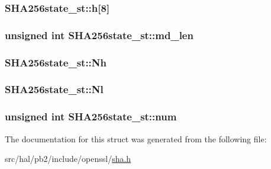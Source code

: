 \subsubsection[{\texorpdfstring{h}{h}}]{ S\+H\+A256state\+\_\+st\+::h\mbox{[}8\mbox{]}}\hypertarget{struct_s_h_a256state__st_a8a5e81981080254a7aa9ad6e11a4f253}{}\label{struct_s_h_a256state__st_a8a5e81981080254a7aa9ad6e11a4f253}
\subsubsection[{\texorpdfstring{md\+\_\+len}{md_len}}]{\setlength{\rightskip}{0pt plus 5cm}unsigned int S\+H\+A256state\+\_\+st\+::md\+\_\+len}\hypertarget{struct_s_h_a256state__st_a8156b1d2d8afc2bd0f0875a943b9f36a}{}\label{struct_s_h_a256state__st_a8156b1d2d8afc2bd0f0875a943b9f36a}
\subsubsection[{\texorpdfstring{Nh}{Nh}}]{ S\+H\+A256state\+\_\+st\+::\+Nh}\hypertarget{struct_s_h_a256state__st_a02ad38687202dc1f21f78925599ec5ca}{}\label{struct_s_h_a256state__st_a02ad38687202dc1f21f78925599ec5ca}
\subsubsection[{\texorpdfstring{Nl}{Nl}}]{ S\+H\+A256state\+\_\+st\+::\+Nl}\hypertarget{struct_s_h_a256state__st_ac34962074aa1766470fae99d0e2aef9b}{}\label{struct_s_h_a256state__st_ac34962074aa1766470fae99d0e2aef9b}
\subsubsection[{\texorpdfstring{num}{num}}]{\setlength{\rightskip}{0pt plus 5cm}unsigned int S\+H\+A256state\+\_\+st\+::num}\hypertarget{struct_s_h_a256state__st_a64f6a539f36e85e82781026b68c968cf}{}\label{struct_s_h_a256state__st_a64f6a539f36e85e82781026b68c968cf}


The documentation for this struct was generated from the following file\+:\begin{DoxyCompactItemize}
\item 
src/hal/pb2/include/openssl/\hyperlink{sha_8h}{sha.\+h}\end{DoxyCompactItemize}
